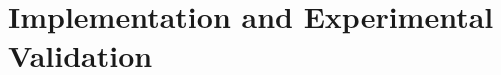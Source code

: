 \documentclass[letterpaper,10pt,conference]{ieeeconf}
\begin{document}










\section{Implementation and Experimental Validation}
\label{sec:experiments}

\end{document}
